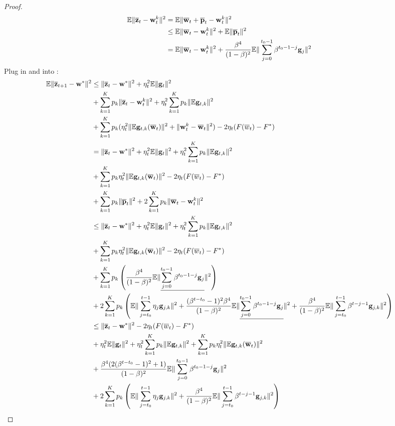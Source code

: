 \begin{proof}
\begin{align}
	\mathbb{E} \|\overline{{\mathbf{z}}}_t - {\mathbf{w}}_t^k\|^2 & =  \mathbb{E} \|\overline{{\mathbf{w}}}_t + \overline{{\mathbf{p}}}_{t}  - {\mathbf{w}}_t^k\|^2\\ 
 & \leq  \mathbb{E} \|\overline{{\mathbf{w}}}_t -{\mathbf{w}}_t^k \|^2 + \mathbb{E}\| \overline{{\mathbf{p}}}_{t}\|^2  \\
 &  =\mathbb{E} \|\overline{{\mathbf{w}}}_t -{\mathbf{w}}_t^k \|^2 + \frac{\beta^4}{(1-\beta)^2}\mathbb{E}\|\sum_{j=0}^{t_0 - 1}\beta^{t_0-1-j}{\mathbf{g}}_j\|^2 \label{eq:nagcvx6}
\end{align}
Plug in \eq{\ref{eq:nagcvx5}} and \eq{\ref{eq:nagcvx6}} into
\eq{\ref{eq:nagcvx4}}:
\begin{align}
	\mathbb{E}\|\overline{{\mathbf{z}}}_{t+1} - {\mathbf{w}}^* \|^2 & \leq \| \overline{{\mathbf{z}}}_{t} - {\mathbf{w}}^*\|^2  +  \eta_t^2\mathbb{E}\|{\mathbf{g}}_t\|^2  \nonumber\\
	&  + \sum_{k=1}^K p_k \|\overline{{\mathbf{z}}}_t - {\mathbf{w}}_t^k\|^2  +\eta^2_t \sum_{k=1}^K p_k\|\mathbb{E} {\mathbf{g}}_{t,k}\|^2 \nonumber \\
	& + \sum_{k=1}^K p_k (\eta_t^2 \|\mathbb{E} {\mathbf{g}}_{t,k}(\overline{{\mathbf{w}}}_t)\|^2 + \|{\mathbf{w}}_t^k - \overline{{\mathbf{w}}}_t\|^2) - 2\eta_t(F(\overline{w}_t) - F^*) \\
	& =  \| \overline{{\mathbf{z}}}_{t} - {\mathbf{w}}^*\|^2  +  \eta_t^2\mathbb{E}\|{\mathbf{g}}_t\|^2 +\eta^2_t \sum_{k=1}^K p_k\|\mathbb{E} {\mathbf{g}}_{t,k}\|^2  \nonumber\\
	& + \sum_{k=1}^K p_k \eta_t^2 \|\mathbb{E} {\mathbf{g}}_{t,k}(\overline{{\mathbf{w}}}_t)\|^2  - 2\eta_t(F(\overline{w}_t) - F^*) \nonumber \\
	&  + \sum_{k=1}^K p_k \|{\overline{\mathbf{p}}}_t\|^2 + 2\sum_{k=1}^K p_k \|{\overline{\mathbf{w}}}_t - {\mathbf{w}}_t^k\|^2  \\
	& \leq \| \overline{{\mathbf{z}}}_{t} - {\mathbf{w}}^*\|^2  +  \eta_t^2\mathbb{E}\|{\mathbf{g}}_t\|^2 +\eta^2_t \sum_{k=1}^K p_k\|\mathbb{E} {\mathbf{g}}_{t,k}\|^2  \nonumber\\
	& + \sum_{k=1}^K p_k \eta_t^2 \|\mathbb{E} {\mathbf{g}}_{t,k}(\overline{{\mathbf{w}}}_t)\|^2  - 2\eta_t(F(\overline{w}_t) - F^*) \nonumber \\
	& + \sum_{k=1}^K p_k \left(\frac{\beta^4}{(1-\beta)^2}\mathbb{E}\|\underline{\sum_{j=0}^{t_0 - 1}\beta^{t_0-1-j}{\mathbf{g}}_j}\|^2 \right) \nonumber\\
	& + 2\sum_{k=1}^K p_k \left(\mathbb{E} \|\sum_{j=t_0}^{t-1}\eta_j {\mathbf{g}}_{j,k}\|^2 + \frac{(\beta^{t-t_0}-1)^2\beta^4}{(1-\beta)^2}\mathbb{E}\|\underline{\sum_{j=0}^{t_0 - 1}\beta^{t_0-1-j}{\mathbf{g}}_j}\|^2 + \frac{\beta^4}{(1 - \beta)^2} \mathbb{E}\|\sum_{j=t_0}^{t-1}\beta^{t-j-1}{\mathbf{g}}_{j,k}\|^2 \right) \\
	& \leq \| \overline{{\mathbf{z}}}_{t} - {\mathbf{w}}^*\|^2  - 2\eta_t(F(\overline{w}_t) - F^*)  \nonumber\\
	& +  \eta_t^2\mathbb{E}\|{\mathbf{g}}_t\|^2 +\eta^2_t \sum_{k=1}^K p_k\|\mathbb{E} {\mathbf{g}}_{t,k}\|^2 + \sum_{k=1}^K p_k \eta_t^2 \|\mathbb{E} {\mathbf{g}}_{t,k}(\overline{{\mathbf{w}}}_t)\|^2  \nonumber \\
	& + \frac{\beta^4(2(\beta^{t-t_0}-1)^2 + 1)}{(1-\beta)^2} \mathbb{E}\|\sum_{j=0}^{t_0 - 1}\beta^{t_0-1-j}{\mathbf{g}}_j\|^2 \nonumber\\
	& + 2\sum_{k=1}^K p_k \left(\mathbb{E} \|\sum_{j=t_0}^{t-1}\eta_j {\mathbf{g}}_{j,k}\|^2  + \frac{\beta^4}{(1 - \beta)^2} \mathbb{E}\|\sum_{j=t_0}^{t-1}\beta^{t-j-1}{\mathbf{g}}_{j,k}\|^2 \right) \label{eq:nagcvx7}
\end{align}


\end{proof}
